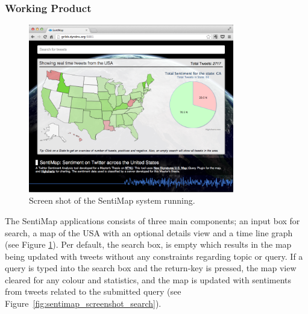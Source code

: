 \subsubsection{Working Product}

\begin{figure}[htb!]
\begin{center}
 \includegraphics[width=0.8\textwidth]{../img/sentimap_screenshot.png}
 \caption{Screen shot of the SentiMap system running.}
 \label{fig:sentimap_screenshot}
\end{center}
\end{figure}

The SentiMap applications consists of three main components; an input box for search, a map of the USA with an optional details view and a time line graph (see Figure \ref{fig:sentimap_screenshot}). Per default, the search box, is empty which results in the map being updated with tweets without any constraints regarding topic or query. If a query is typed into the search box and the return-key is pressed, the map view cleared for any colour and statistics, and the map is updated with sentiments from tweets related to the submitted query (see Figure~\ref{fig:sentimap_screenshot_search}). 


